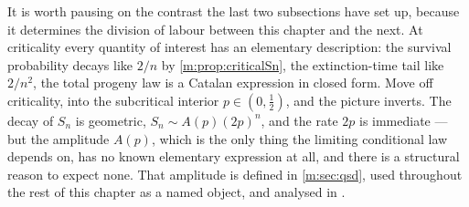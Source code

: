 It is worth pausing on the contrast the last two subsections have set up, because
it determines the division of labour between this chapter and the next. At
criticality every quantity of interest has an elementary description: the survival
probability decays like $2/n$ by \cref{m:prop:criticalSn}, the extinction-time tail
like $2/n^2$, the total progeny law is a Catalan expression in closed form. Move
off criticality, into the subcritical interior $p\in(0,\tfrac12)$, and the picture
inverts. The decay of $S_n$ is geometric, $S_n\sim A(p)(2p)^n$, and the rate $2p$ is
immediate --- but the amplitude $A(p)$, which is the only thing the limiting
conditional law depends on, has no known elementary expression at all, and there is
a structural reason to expect none. That amplitude is defined in \cref{m:sec:qsd},
used throughout the rest of this chapter as a named object, and analysed in \ChA.

\FloatBarrier
